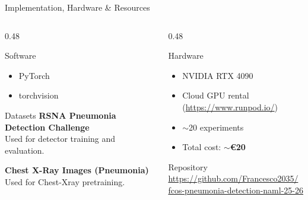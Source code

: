 \documentclass[aspectratio=169,11pt]{beamer}
\begin{document}
\begin{frame}{Implementation, Hardware & Resources}

\begin{columns}[t]

\begin{column}{0.48\textwidth}

\begin{block}{Software}
\small
\begin{itemize}
    \item PyTorch
    \item torchvision
\end{itemize}
\end{block}

\vspace{0.2cm}

\begin{block}{Datasets}
\small
\textbf{RSNA Pneumonia Detection Challenge}\\
Used for detector training and evaluation.

\vspace{0.12cm}

\textbf{Chest X-Ray Images (Pneumonia)}\\
Used for Chest-Xray pretraining.
\end{block}

\end{column}

\begin{column}{0.48\textwidth}

\begin{block}{Hardware}
\small
\begin{itemize}
    \item NVIDIA RTX 4090
    \item Cloud GPU rental (\url{https://www.runpod.io/})
    \item $\sim$20 experiments
    \item Total cost: $\sim$\textbf{\euro20}
\end{itemize}
\end{block}

\vspace{0.2cm}

\begin{block}{Repository}
\centering
\small
\url{https://github.com/Francesco2035/}\\
\url{fcos-pneumonia-detection-naml-25-26}
\end{block}

\end{column}

\end{columns}

\end{frame}
\end{document}
